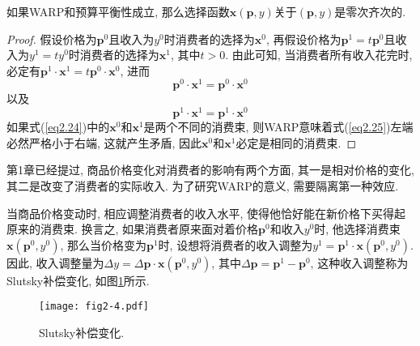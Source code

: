 \documentclass[cn, 12pt, math=mtpro2, bibstyle=apa, blue]{elegantbook}
\newcommand{\p}{\mathbf{p}}
\newcommand{\x}{\mathbf{x}}
\begin{document}
\begin{theorem}
如果WARP和预算平衡性成立, 那么选择函数$\x(\p,y)$关于$(\p,y)$是零次齐次的.
\end{theorem}
\begin{proof}
  假设价格为$\p^0$且收入为$y^0$时消费者的选择为$\x^0$, 再假设价格为$\p^1=t\p^0$且收入为$y^1=ty^0$时消费者的选择为$\x^1$, 其中$t>0$. 由此可知, 当消费者所有收入花完时, 必定有$\p^1\cdot\x^1=t\p^0\cdot\x^0$, 进而
  \begin{equation}\label{eq2.24}
    \p^0\cdot\x^1=\p^0\cdot\x^0
  \end{equation}
  以及
  \begin{equation}\label{eq2.25}
    \p^1\cdot\x^1=\p^1\cdot\x^0
  \end{equation}
  如果式(\ref{eq2.24})中的$\x^0$和$\x^1$是两个不同的消费束, 则WARP意味着式(\ref{eq2.25})左端必然严格小于右端, 这就产生矛盾, 因此$\x^0$和$\x^1$必定是相同的消费束.
\end{proof}

第1章已经提过, 商品价格变化对消费者的影响有两个方面, 其一是相对价格的变化, 其二是改变了消费者的实际收入. 为了研究WARP的意义, 需要隔离第一种效应.

当商品价格变动时, 相应调整消费者的收入水平, 使得他恰好能在新价格下买得起原来的消费束. 换言之, 如果消费者原来面对着价格$\p^0$和收入$y^0$时, 他选择消费束$\x(\p^0,y^0)$, 那么当价格变为$\p^1$时, 设想将消费者的收入调整为$y^1=\p^1\cdot\x(\p^0,y^0)$. 因此, 收入调整量为$\Delta y=\Delta \p\cdot\x(\p^0,y^0)$, 其中$\Delta \p=\p^1-\p^0$, 这种收入调整称为Slutsky补偿变化, 如图\ref{fig2.4}所示.

\begin{figure}[htbp!]
  \centering
  \texttt{[image: fig2-4.pdf]}
  \caption{Slutsky补偿变化.}\label{fig2.4}
\end{figure}
\end{document}
